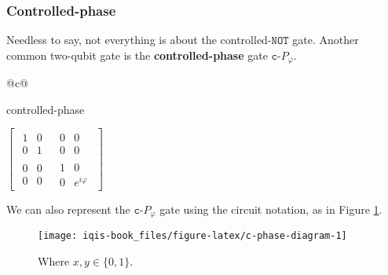 \documentclass[fleqn]{article}
\newenvironment{idea}{\noindent}{\medskip}
\begin{document}
\hypertarget{controlled-phase}{%
\subsubsection{Controlled-phase}\label{controlled-phase}}

Needless to say, not everything is about the controlled-\(\texttt{NOT}\) gate.
Another common two-qubit gate is the \textbf{controlled-phase} gate \(\texttt{c-}P_\varphi\).

\begin{idea}

\begin{longtable}[]{@{}c@{}}
\toprule
\begin{minipage}[b]{0.97\columnwidth}\centering
controlled-phase\strut
\end{minipage}\tabularnewline
\midrule
\endhead
\begin{minipage}[t]{0.97\columnwidth}\centering
\(\left[\begin{array}{c|c}\begin{matrix}1&0\\0&1\end{matrix}&\begin{matrix}0&0\\0&0\end{matrix}\\\hline\begin{matrix}0&0\\0&0\end{matrix}&\begin{matrix}1&0\\0&e^{i\varphi}\end{matrix}\end{array}\right]\)\strut
\end{minipage}\tabularnewline
\bottomrule
\end{longtable}


\end{idea}

We can also represent the \(\texttt{c-}P_\varphi\) gate using the circuit notation, as in Figure \ref{fig:c-phase-diagram}.



\begin{figure}[H]

{\centering \texttt{[image: iqis-book\_files/figure-latex/c-phase-diagram-1]} 

}

\caption{Where \(x,y\in\{0,1\}\).}\label{fig:c-phase-diagram}
\end{figure}
\end{document}
